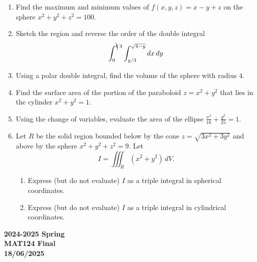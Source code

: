 \documentclass[a4paper, 12pt]{article}
\begin{document}
\begin{enumerate}[leftmargin=*,label=\textbf{\arabic*.}]
\item Find the maximum and minimum values of $f(x,y,z)=x-y+z$ on the sphere $x^2+y^2+z^2=100$.

\item Sketch the region and reverse the order of the double integral
\[\int_0^{\bcancel4\:3}\int_{y/3}^{\sqrt{4-y}}dx\,dy\]

\item Using a polar double integral, find the volume of the sphere with radius $4$.

\item Find the surface area of the portion of the paraboloid $z=x^2+y^2$ that lies in the cylinder $x^2+y^2=1$.

\item Using the change of variables, evaluate the area of the ellipse $\displaystyle\frac{x^2}{16}+\frac{y^2}{25}=1$.

\item Let $R$ be the solid region bounded below by the cone $z=\sqrt{3x^2+3y^2}$ and above by the sphere $x^2+y^2+z^2=9$. Let
\[{I}=\iiint_R(x^2+y^2)\,dV.\]

\begin{enumerate}[leftmargin=*,label=\textbf{\alph*.}]
\item Express (but do not evaluate) ${I}$ as a triple integral in spherical coordinates.
\item Express (but do not evaluate) ${I}$ as a triple integral in cylindrical coordinates.
\end{enumerate}
\end{enumerate}

\newpage
{}
{}

\begin{center}
\textbf{2024-2025 Spring \\MAT124 Final\\18/06/2025}
\end{center}
\end{document}
